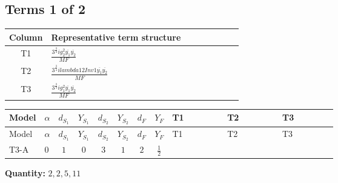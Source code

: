 \documentclass[8pt]{article}
\begin{document}
\begin{landscape}
\subsection*{Terms 1 of 2}
\begin{center}
\begin{tabular}{@{}c >{\raggedright\arraybackslash}p{0.82\linewidth}@{}}
\toprule
Column & Representative term structure \\
\midrule
T1 & \(\displaystyle \frac{3^{\frac{3}{4}} i g_{2}^{2} \overline{y_{1}} \overline{y_{2}}}{MF}\) \\
\midrule
T2 & \(\displaystyle \frac{3^{\frac{3}{4}} i lambda12Inv1 \overline{y_{1}} \overline{y_{2}}}{MF}\) \\
\midrule
T3 & \(\displaystyle \frac{3^{\frac{3}{4}} i g_{1}^{2} \overline{y_{1}} \overline{y_{2}}}{MF}\) \\
\midrule
\bottomrule
\end{tabular}
\end{center}
\smallskip
\tiny
\begin{longtable}{@{}llcccccc >{\raggedright\arraybackslash}p{0.21\linewidth} >{\raggedright\arraybackslash}p{0.21\linewidth} >{\raggedright\arraybackslash}p{0.21\linewidth}@{}}
\toprule
Model & $\alpha$ & $d_{S_1}$ & $Y_{S_1}$ & $d_{S_2}$ & $Y_{S_2}$ & $d_F$ & $Y_F$ & T1 & T2 & T3 \\
\midrule
\endfirsthead
\toprule
Model & $\alpha$ & $d_{S_1}$ & $Y_{S_1}$ & $d_{S_2}$ & $Y_{S_2}$ & $d_F$ & $Y_F$ & T1 & T2 & T3 \\
\midrule
\endhead
T3-A & $0$ & $1$ & $0$ & $3$ & $1$ & $2$ & $\frac{1}{2}$ & \scriptsize\adjustbox{max width=\linewidth}{$\begin{gathered} - \frac{11 \cdot 3^{\frac{3}{4}} i g_{2}^{2} \overline{y_{1}} \overline{y_{2}}}{8 MF}\end{gathered}$} & \scriptsize\adjustbox{max width=\linewidth}{$\begin{gathered} - \frac{3^{\frac{3}{4}} i lambda12Inv1 \overline{y_{1}} \overline{y_{2}}}{6 MF}\end{gathered}$} & \scriptsize\adjustbox{max width=\linewidth}{$\begin{gathered} - \frac{3^{\frac{3}{4}} i g_{1}^{2} \overline{y_{1}} \overline{y_{2}}}{8 MF}\end{gathered}$} \\
\midrule
\bottomrule
\end{longtable}
\clearpage
\noindent\textbf{Quantity: }$\mathrm{2,2,5,11}$\par\smallskip

\end{landscape}
\end{document}
